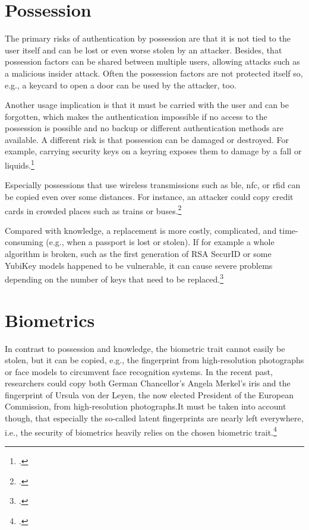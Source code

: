 \section{Possession}
\label{sec:possession-security}

The primary risks of authentication by possession are that it is not tied to the user itself and can be lost or even worse stolen by an attacker. Besides, that possession factors can be shared between multiple users, allowing attacks such as a malicious insider attack. Often the possession factors are not protected itself so, e.g., a keycard to open a door can be used by the attacker, too.

Another usage implication is that it must be carried with the user and can be forgotten, which makes the authentication impossible if no access to the possession is possible and no backup or different authentication methods are available. A different risk is that possession can be damaged or destroyed. For example, carrying security keys on a keyring exposes them to damage by a fall or liquids.\footcites[See][263--264]{shostack2014threat}

Especially possessions that use wireless transmissions such as \gls{ble}, \gls{nfc}, or \gls{rfid} can be copied even over some distances. For instance, an attacker could copy credit cards in crowded places such as trains or buses.\footcite[See][]{6892730}

Compared with knowledge, a replacement is more costly, complicated, and time-consuming (e.g., when a passport is lost or stolen). If for example a whole algorithm is broken, such as the first generation of RSA SecurID or some YubiKey models happened to be vulnerable, it can cause severe problems depending on the number of keys that need to be replaced.\footcites[See][18]{dasgupta2017multi}[See][]{BIRYUKOV2005364}[See][]{yubikey-heise}

\section{Biometrics}

In contrast to possession and knowledge, the biometric trait cannot easily be stolen, but it can be copied, e.g., the fingerprint from high-resolution photographs or 
face models to circumvent face recognition systems. In the recent past, researchers could copy both German Chancellor's Angela Merkel's iris and the fingerprint of Ursula von der Leyen, the now elected President of the European Commission, from high-resolution photographs.It must be taken into account though, that especially the so-called latent fingerprints are nearly left everywhere, i.e., the security of biometrics heavily relies on the chosen biometric trait.\footcites[See][]{185181}[See][]{220566}[See][e199]{MARTIN2013e189}[See][]{ccc-merkel}

